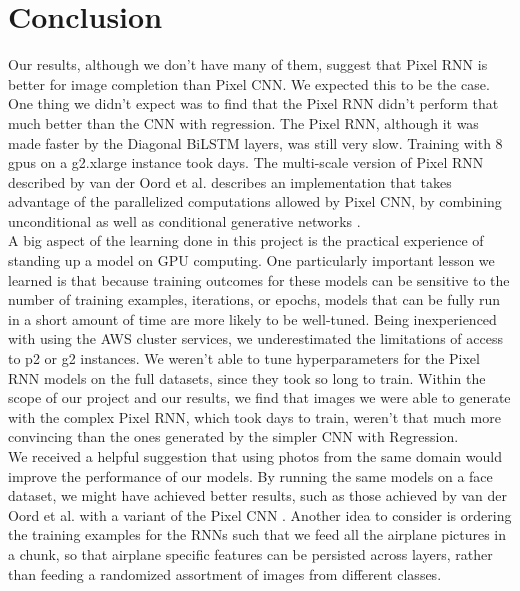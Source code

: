 \documentclass[10pt,twocolumn,letterpaper]{article}
\begin{document}
\section{Conclusion}
Our results, although we don't have many of them, suggest that Pixel RNN is better for image completion than Pixel CNN. We expected this to be the case. One thing we didn't expect was to find that the Pixel RNN didn't perform that much better than the CNN with regression. The Pixel RNN, although it was made faster by the Diagonal BiLSTM layers, was still very slow. Training with 8 gpus on a g2.xlarge instance took days. The multi-scale version of Pixel RNN described by van der Oord et al. describes an implementation that takes advantage of the parallelized computations allowed by Pixel CNN, by combining unconditional as well as conditional generative networks \cite{pixelRNN}. \\

A big aspect of the learning done in this project is the practical experience of standing up a model on GPU computing. One particularly important lesson we learned is that because training outcomes for these models can be sensitive to the number of training examples, iterations, or epochs, models that can be fully run in a short amount of time are more likely to be well-tuned. Being inexperienced with using the AWS cluster services, we underestimated the limitations of access to p2 or g2 instances. We weren't able to tune hyperparameters for the Pixel RNN models on the full datasets, since they took so long to train. Within the scope of our project and our results, we find that images we were able to generate with the complex Pixel RNN, which took days to train, weren't that much more convincing than the ones generated by the simpler CNN with Regression.\\

We received a helpful suggestion that using photos from the same domain would improve the performance of our models. By running the same models on a face dataset, we might have achieved better results, such as those achieved by van der Oord et al. with a variant of the Pixel CNN \cite{pixelCNN}. Another idea to consider is ordering the training examples for the RNNs such that we feed all the airplane pictures in a chunk, so that airplane specific features can be persisted across layers, rather than feeding a randomized assortment of images from different classes.\\
\end{document}
